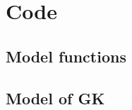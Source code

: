 
\appendixtoc
{}


%  
%
%


\chapter{Code}

\section{Model functions}



\section{Model of GK}






